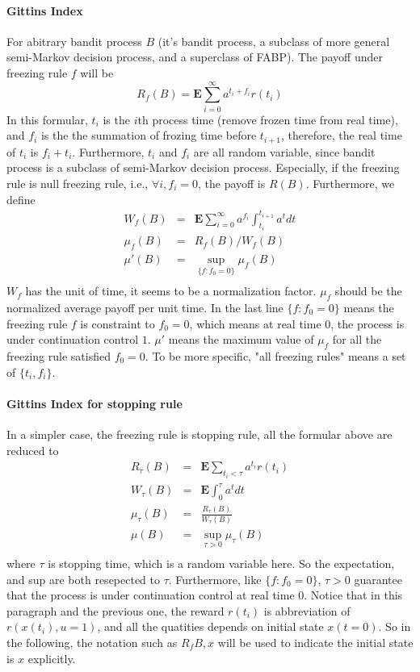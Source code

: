 \paragraph{Gittins Index}
For abitrary bandit process $B$ (it's bandit process, a subclass of more general semi-Markov decision process,
and a superclass of FABP). The payoff under freezing rule $f$ will be
\[
		R_f(B) = \mathbf{E} \sum_{i=0}^{\infty} a^{t_i + f_i} r(t_i)
\]
In this formular, $t_i$ is the $i$th process time (remove frozen time from real time), and $f_i$ is the 
the summation of frozing time before $t_{i+1}$, therefore, the real time of $t_i$ is $f_i + t_i$. Furthermore,
$t_i$ and $f_i$ are all random variable, since bandit process is a subclass of semi-Markov decision process.
Especially, if the freezing rule is null freezing rule, i.e., $\forall i, f_i = 0$, the payoff is $R(B)$.
Furthermore, we define 
\begin{eqnarray*}
		W_f(B)  &=& \mathbf{E} \sum_{i=0}^{\infty}a^{f_i}\int_{t_i}^{t_{i+1}} a^t dt \\
		\mu_f(B) &=& R_f(B)/W_f(B) \\
		\mu'(B) &=& \sup_{\{f:f_0=0\}} \mu_f(B) \\
\end{eqnarray*}
$W_f$ has the unit of time, it seems to be a normalization factor. $\mu_f$ should be the normalized average 
payoff per unit time. In the last line $\{f:f_0=0\}$ means the freezing rule $f$ is constraint to $f_0=0$, 
which means at real time $0$, the process is under continuation control $1$. $\mu'$ means the maximum value 
of $\mu_f$ for all the freezing rule satisfied $f_0=0$. To be more specific, "all freezing rules" means
a set of $\{t_i,f_i\}$.

\paragraph{Gittins Index for stopping rule}
In a simpler case, the freezing rule is stopping rule, all the formular above are reduced to
\begin{eqnarray*}
		R_{\tau}(B) &=& \mathbf{E} \sum_{t_i < \tau} a^{t_i} r(t_i) \\
		W_{\tau}(B) &=& \mathbf{E} \int_0^{\tau} a^t dt \\
		\mu_{\tau}(B) &=& \frac{R_{\tau}(B)}{W_{\tau}(B)} \\
		\mu(B) &=& \sup_{\tau > 0 } \mu_{\tau}(B) \\
\end{eqnarray*}
where $\tau$ is stopping time, which is a random variable here. So the expectation, and sup are both resepected
to $\tau$. Furthermore, like $\{f:f_0=0\}$, $\tau > 0$ guarantee that the process is under continuation control
at real time $0$.
Notice that in this paragraph and the previous one, the reward $r(t_i)$ is abbreviation of $r(x(t_i),u=1)$, and 
all the quatities depends on initial state $x(t=0)$. So in the following, the notation such as $R_f{B,x}$ will
be used to indicate the initial state is $x$ explicitly.
